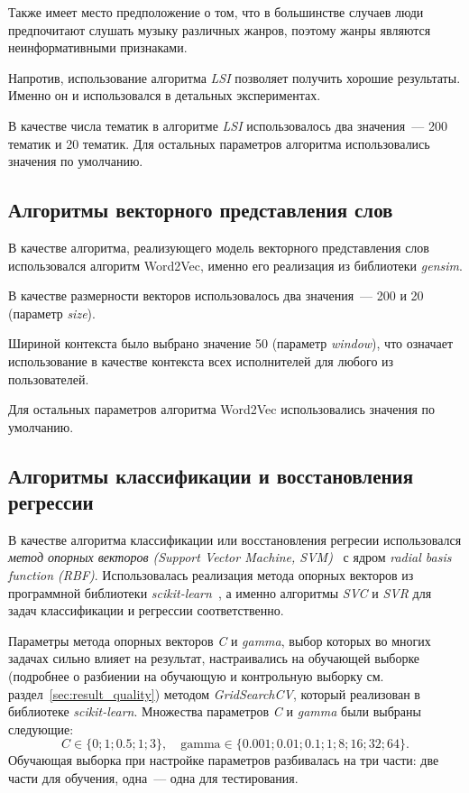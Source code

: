 Также имеет место предположение о том, что в большинстве случаев
люди предпочитают слушать музыку различных жанров, поэтому жанры
являются неинформативными признаками.

Напротив, использование алгоритма \textit{LSI} позволяет получить хорошие
результаты. Именно он и использовался в детальных экспериментах.

В качестве числа тематик в алгоритме \textit{LSI} использовалось
два значения~--- 200 тематик и 20 тематик. 
Для остальных параметров алгоритма использовались значения по умолчанию.

\subsection{Алгоритмы векторного представления слов}

В качестве алгоритма, реализующего модель векторного представления
слов использовался алгоритм Word2Vec, именно его реализация из
библиотеки \textit{gensim}.  

В качестве размерности векторов использовалось два значения~--- 200
и 20 (параметр \textit{size}).

Шириной контекста было выбрано значение 50 (параметр \textit{window}),
что означает использование в качестве контекста всех исполнителей для
любого из пользователей.

Для остальных параметров алгоритма Word2Vec использовались значения
по умолчанию.

\subsection{Алгоритмы классификации и восстановления регрессии}

В качестве алгоритма классификации или восстановления регресии
использовался \textit{метод опорных векторов (Support Vector Machine,
SVM)}~\cite{cortes1995support} с ядром 
\textit{radial basis function (RBF)}. Использовалась реализация
метода опорных векторов из программной библиотеки 
\textit{scikit-learn}~\cite{sklearn}, а именно алгоритмы
\textit{SVC} и \textit{SVR} для задач классификации и регрессии
соответственно.

Параметры метода опорных векторов \textit{C} и \textit{gamma},
выбор которых во многих задачах сильно влияет на результат,
настраивались на обучающей выборке (подробнее о разбиении
на обучающую и контрольную выборку см.
раздел~\ref{sec:result_quality}) методом \textit{GridSearchCV},
который реализован в библиотеке \textit{scikit-learn}. Множества
параметров \textit{C} и \textit{gamma} были выбраны следующие:
\[
    C \in \{0; 1; 0.5; 1; 3\},\quad
    \mathrm{gamma} \in \{0.001; 0.01; 0.1; 1; 8; 16; 32; 64\}.
\]
Обучающая выборка при настройке параметров разбивалась на три
части: две части для обучения, одна~--- одна для тестирования.

